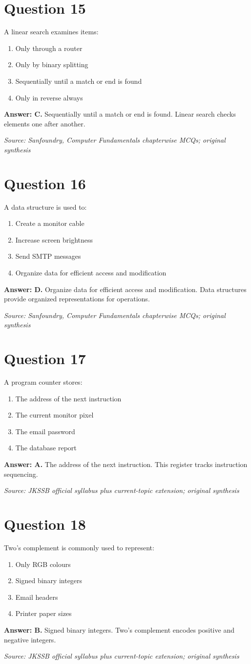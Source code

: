 \documentclass[11pt,a4paper]{book}
\newcommand{\source}[1]{\par\smallskip\textit{Source: #1}}
\newcommand{\answer}[2]{\par\textbf{Answer: #1.} #2}
\begin{document}
\section*{Question 15}
A linear search examines items:
\begin{enumerate}[label=\Alph*.]
\item Only through a router
\item Only by binary splitting
\item Sequentially until a match or end is found
\item Only in reverse always
\end{enumerate}
\answer{C}{Sequentially until a match or end is found. Linear search checks elements one after another.}
\source{Sanfoundry, Computer Fundamentals chapterwise MCQs; original synthesis}
\section*{Question 16}
A data structure is used to:
\begin{enumerate}[label=\Alph*.]
\item Create a monitor cable
\item Increase screen brightness
\item Send SMTP messages
\item Organize data for efficient access and modification
\end{enumerate}
\answer{D}{Organize data for efficient access and modification. Data structures provide organized representations for operations.}
\source{Sanfoundry, Computer Fundamentals chapterwise MCQs; original synthesis}
\section*{Question 17}
A program counter stores:
\begin{enumerate}[label=\Alph*.]
\item The address of the next instruction
\item The current monitor pixel
\item The email password
\item The database report
\end{enumerate}
\answer{A}{The address of the next instruction. This register tracks instruction sequencing.}
\source{JKSSB official syllabus plus current-topic extension; original synthesis}
\section*{Question 18}
Two’s complement is commonly used to represent:
\begin{enumerate}[label=\Alph*.]
\item Only RGB colours
\item Signed binary integers
\item Email headers
\item Printer paper sizes
\end{enumerate}
\answer{B}{Signed binary integers. Two’s complement encodes positive and negative integers.}
\source{JKSSB official syllabus plus current-topic extension; original synthesis}
\end{document}
